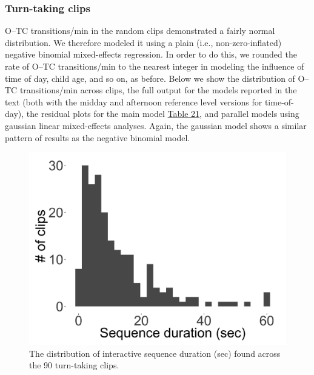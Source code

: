 \documentclass[floatsintext,man]{apa6}
\theoremstyle{definition}
\theoremstyle{definition}
\theoremstyle{definition}
\theoremstyle{remark}
\begin{document}
\newpage

\subsubsection{Turn-taking clips}\label{models-seqdur-turntaking}

O--TC transitions/min in the random clips demonstrated a fairly normal
distribution. We therefore modeled it using a plain (i.e.,
non-zero-inflated) negative binomial mixed-effects regression. In order
to do this, we rounded the rate of O--TC transitions/min to the nearest
integer in modeling the influence of time of day, child age, and so on,
as before. Below we show the distribution of O--TC transitions/min
across clips, the full output for the models reported in the text (both
with the midday and afternoon reference level versions for time-of-day),
the residual plots for the main model \protect\hyperlink{tab21}{Table
21}, and parallel models using gaussian linear mixed-effects analyses.
Again, the gaussian model shows a similar pattern of results as the
negative binomial model.

\begin{figure}

{\centering \includegraphics[width=0.4\linewidth]{www/seqdur_turntaking_distribution} 

}

\caption{The distribution of interactive sequence duration (sec) found across the 90 turn-taking clips.}\label{fig:fig28}
\end{figure}
\end{document}
